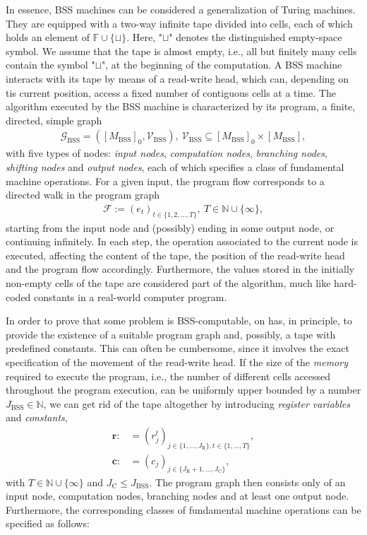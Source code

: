 \documentclass[conference]{IEEEtran}
\def\G{{\mathcal G}}
\def\V{{\mathcal V}}
\def\F{{\mathcal F}}
\def\NN{{\mathbb N}}
\def\FF{{\mathbb F}}
\newcommand{\BSS}{\mathrm{BSS}}
\begin{document}
	In essence, BSS machines can be considered a generalization of Turing machines. They are equipped with a two-way infinite tape divided into cells, each of which holds an 
	element of \(\FF\cup\{\sqcup\}\). Here, "\(\sqcup\)" denotes the distinguished empty-space symbol. We assume that the tape is almost empty, i.e., all but finitely many cells 
	contain the symbol "\(\sqcup\)", at the beginning of the computation. A BSS machine interacts with its tape by means of a read-write head, which can, depending on tis current 
	position, access a fixed number of contiguous cells at a time. The algorithm executed by the BSS machine is characterized by its program, a finite, directed, simple graph 
	\begin{align*}   \G_\BSS = ([M_\BSS]_{0}, \V_\BSS),~ \V_\BSS \subseteq [M_\BSS]_{0} \times [M_\BSS],
	\end{align*} 
	with five types of nodes: \emph{input nodes}, \emph{computation nodes}, \emph{branching nodes}, \emph{shifting nodes} and \emph{output nodes}, each of which specifies a class 
	of fundamental machine operations. For a given input, the program flow corresponds to a directed walk in the program graph
	\begin{align*}	\F := (e_t)_{t\in\{1,2,\ldots,T\}},~T\in\NN\cup \{\infty\},
	\end{align*}
	starting from the input node and (possibly) ending in some output node, or continuing infinitely. In each step, the operation associated to the current node is executed, 
	affecting the content of the tape, the position of the read-write head and the program flow accordingly. Furthermore, the values stored in the initially non-empty cells 
	of the tape are considered part of the algorithm, much like hard-coded constants in a real-world computer program. 

	In order to prove that some problem is BSS-computable, on has, in principle, to provide the existence of a suitable program graph and, possibly, a tape with predefined constants. 
	This can often be cumbersome, since it involves the exact specification of the movement of the read-write head. If the size of the \emph{memory} required to execute the program, i.e., 
	the number of different cells accessed throughout the program execution, can be uniformly upper bounded by a number \(J_\BSS \in \NN\), we can get rid of the tape altogether by 
	introducing \emph{register variables} and \emph{constants},
	\begin{align*}	\bm{r} :&= (r_j^t)_{j\in\{1,\ldots,J_{\mathrm{R}}\}, t\in\{1,\ldots,T\}},\\
					\bm{c} :&= (c_j)_{j\in\{J_{\mathrm{R}} + 1,\ldots,J_{\mathrm{C}}\}},
	\end{align*}
	with \(T\in\NN\cup\{\infty\}\) and \(J_{\mathrm{C}} \leq J_\BSS\). The program graph then consists only of an input node, computation nodes, branching nodes and at least one output node.
	Furthermore, the corresponding classes of fundamental machine operations can be specified as follows:
	
\end{document}
